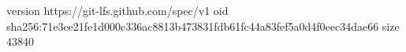 version https://git-lfs.github.com/spec/v1
oid sha256:71e3ee21fe1d000c336ac8813b473831fdb61fc44a83fef5a0d4f0eec34dae66
size 43840
